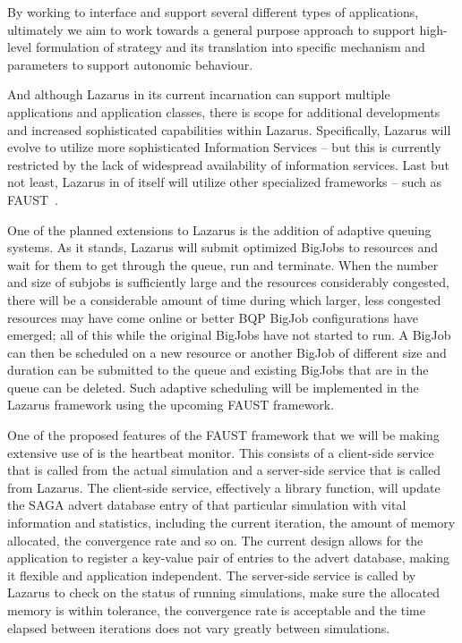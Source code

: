 \documentclass{sig-alternate}
\begin{document}
By working to interface and support several different types of
applications, ultimately we aim to work towards a general purpose
approach to support high-level formulation of strategy and its
translation into specific mechanism and parameters to support
autonomic behaviour.

And although Lazarus in its current incarnation can support multiple applications and application classes, there is scope for additional developments and increased sophisticated capabilities within Lazarus.  Specifically, Lazarus will evolve to utilize more sophisticated Information Services -- but this is currently restricted by the lack of widespread availability of information services. Last but not least, Lazarus in of itself will utilize other specialized frameworks -- such as FAUST~\cite{faust_url}.

One of the planned extensions to Lazarus is the addition of adaptive
queuing systems. As it stands, Lazarus will submit optimized BigJobs
to resources and wait for them to get through the queue, run and
terminate.  When the number and size of subjobs is sufficiently large
and the resources considerably congested, there will be a considerable
amount of time during which larger, less congested resources may have
come online or better BQP BigJob configurations have emerged; all of
this while the original BigJobs have not started to run. A BigJob can
then be scheduled on a new resource or another BigJob of different
size and duration can be submitted to the queue and existing BigJobs
that are in the queue can be deleted.  Such adaptive scheduling will
be implemented in the Lazarus framework using the upcoming FAUST
framework.

One of the proposed features of the FAUST framework that we will be making extensive use of is the heartbeat monitor. This consists of a client-side service that is called from the actual simulation and a server-side service that is called from Lazarus. The client-side service, effectively a library function, will update the SAGA advert database entry of that particular simulation with vital information and statistics, including the current iteration, the amount of memory allocated, the convergence rate and so on. The current design allows for the application to register a key-value pair of entries to the advert database, making it flexible and application independent. The server-side service is called by Lazarus to check on the status of running simulations, make sure the allocated memory is within tolerance, the convergence rate is acceptable and the time elapsed between iterations does not vary greatly between simulations. 
\end{document}
